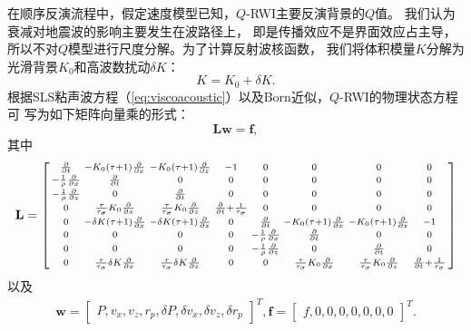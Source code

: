 在顺序反演流程中，假定速度模型已知，$Q$-RWI主要反演背景的$Q$值。
我们认为衰减对地震波的影响主要发生在波路径上，
即是传播效应不是界面效应占主导，所以不对$Q$模型进行尺度分解。为了计算反射波核函数，
我们将体积模量$K$分解为光滑背景$K_0$和高波数扰动$\delta K$：
\begin{equation}
	K = K_0 + \delta K.
\end{equation}
根据SLS粘声波方程（\ref{eq:viscoacoustic}）以及Born近似，$Q$-RWI的物理状态方程可
写为如下矩阵向量乘的形式：
\begin{equation}
    \mathbf{L}\mathbf{w} = \mathbf{f},
    \label{eq:state}
\end{equation}
其中
    \begin{eqnarray*}
        \mathbf{L}= 
        \begin{bmatrix}
            \begin{smallmatrix}
            \frac{\partial}{\partial t} &-K_0(\tau +1)\frac{\partial}{\partial x}
            &-K_0(\tau +1)\frac{\partial}{\partial z} &-1 &0 &0 &0 &0\cr
            -\frac{1}{\rho}\frac{\partial}{\partial x} &\frac{\partial}{\partial t} &0
            &0 &0 &0 &0 &0\cr
            -\frac{1}{\rho}\frac{\partial}{\partial z} &0 &\frac{\partial}{\partial t}
            &0 &0 &0 &0 &0\cr
            0 & \frac{\tau}{\tau_\sigma}K_0\frac{\partial}{\partial x}
            &\frac{\tau}{\tau_\sigma}K_0\frac{\partial}{\partial z}
            &\frac{\partial}{\partial t}+\frac{1}{\tau_\sigma} &0 &0 &0 &0 \cr
            0 &-\delta K(\tau+1)\frac{\partial}{\partial x} &-\delta
            K(\tau+1)\frac{\partial}{\partial z} &0 &\frac{\partial}{\partial t}
            &-K_0(\tau +1)\frac{\partial}{\partial x} &-K_0(\tau
            +1)\frac{\partial}{\partial z} &-1 \cr
            0 &0 &0 &0 &-\frac{1}{\rho}\frac{\partial}{\partial x}
            &\frac{\partial}{\partial t} &0 &0\cr
            0 &0 &0 &0 &-\frac{1}{\rho}\frac{\partial}{\partial z} &0
            &\frac{\partial}{\partial t} &0\cr
            0 &\frac{\tau}{\tau_\sigma}\delta K\frac{\partial}{\partial x}
            &\frac{\tau}{\tau_\sigma}\delta K\frac{\partial}{\partial z} &0 &0 
            & \frac{\tau}{\tau_\sigma}K_0\frac{\partial}{\partial x}
            &\frac{\tau}{\tau_\sigma}K_0\frac{\partial}{\partial z}
            &\frac{\partial}{\partial t}+\frac{1}{\tau_\sigma}
            \end{smallmatrix}
        \end{bmatrix}
    \end{eqnarray*}
以及
    \begin{eqnarray*}
        \mathbf{w} = 
        \begin{bmatrix}
            P , v_x , v_z , r_p ,\delta P ,\delta v_x ,\delta v_z
            ,\delta r_p
        \end{bmatrix}^T,
        \mathbf{f} = 
        \begin{bmatrix}
            f , 0, 0, 0 , 0, 0 , 0, 0
        \end{bmatrix}^T.
    \end{eqnarray*}
